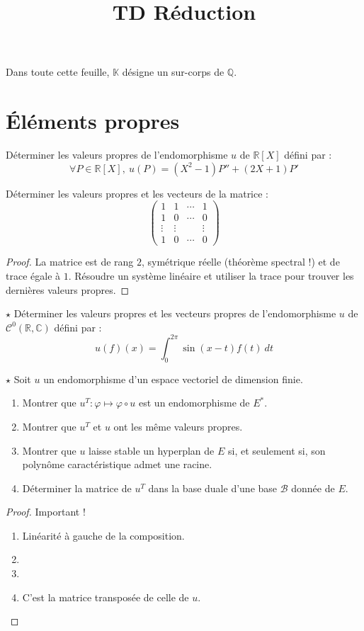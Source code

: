 \documentclass[french,a4paper]{article}
\title{TD Réduction}
\newcommand{\Q}{\mathbb{Q}}
\newcommand{\R}{\mathbb{R}}
\newcommand{\C}{\mathbb{C}}
\newcommand{\K}{\mathbb{K}}
\newcommand{\st}{^*}
\theoremstyle{plain}
\theoremstyle{definition}
\theoremstyle{remark}
\begin{document}
\maketitle

Dans toute cette feuille, $\K$ désigne un sur-corps de $\Q$.

\section{Éléments propres}

\begin{ex}{}
	Déterminer les valeurs propres de l'endomorphisme $u$ de $\R[X]$ défini par : $$\forall P\in\R[X],\ u(P)=(X^2-1)P''+(2X+1)P'$$
\end{ex}

\begin{ex}{}
	Déterminer les valeurs propres et les vecteurs de la matrice : $$\begin{pmatrix}
		1&1&\cdots&1\\
		1&0&\cdots&0\\
		\vdots&\vdots&&\vdots\\
		1&0&\cdots&0
	\end{pmatrix}$$
\end{ex}
\begin{proof}
	La matrice est de rang $2$, symétrique réelle (théorème spectral !) et de trace égale à $1$. Résoudre un système linéaire et utiliser la trace pour trouver les dernières valeurs propres.
\end{proof}

\begin{ex}{$\star$}
	Déterminer les valeurs propres et les vecteurs propres de l'endomorphisme $u$ de $\mathcal{C}^0(\R,\C)$ défini par : $$u(f)(x)=\int_{0}^{2\pi}\sin(x-t)f(t)\ dt$$
\end{ex}

\begin{ex}{$\star$}
	Soit $u$ un endomorphisme d'un espace vectoriel de dimension finie.
	\begin{enumerate}
		\item Montrer que $u^T:\varphi\mapsto\varphi\circ u$ est un endomorphisme de $E\st$.
		\item Montrer que $u^T$ et $u$ ont les même valeurs propres.
		\item Montrer que $u$ laisse stable un hyperplan de $E$ si, et seulement si, son polynôme caractéristique admet une racine.
		\item Déterminer la matrice de $u^T$ dans la base duale d'une base $\mathcal{B}$ donnée de $E$.
	\end{enumerate}
\end{ex}
\begin{proof}
	Important !
	\begin{enumerate}
		\item Linéarité à gauche de la composition.
		\item
		\item 
		\item C'est la matrice transposée de celle de $u$.
	\end{enumerate}
\end{proof}
\end{document}
